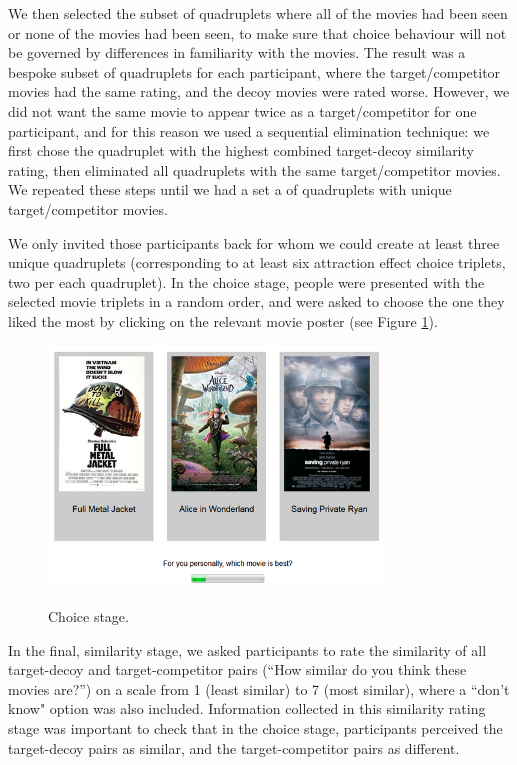 \documentclass[12pt, a4paper]{article}
\begin{document}
We then selected the subset of quadruplets where all of the movies had been seen or none of the movies had been seen, to make sure that choice behaviour will not be governed by differences in familiarity with the movies. The result was a bespoke subset of quadruplets for each participant, where the target/competitor movies had the same rating, and the decoy movies were rated worse. However, we did not want the same movie to appear twice as a target/competitor for one participant, and for this reason we used a sequential elimination technique: we first chose the quadruplet with the highest combined target-decoy similarity rating, then eliminated all quadruplets with the same target/competitor movies. We repeated these steps until we had a set a of quadruplets with unique target/competitor movies.

We only invited those participants back for whom we could create at least three unique quadruplets (corresponding to at least six attraction effect choice triplets, two per each quadruplet). In the choice stage, people were presented with the selected movie triplets in a random order, and were asked to choose the one they liked the most by clicking on the relevant movie poster (see Figure \ref{fig:exp1_screenshot}).

\begin{figure}[htb!]
\centering
\caption{Choice stage.}
\includegraphics[width=0.8\textwidth]{rsz_exp1_choicestage.png}
\label{fig:exp1_screenshot}
\end{figure}

In the final, similarity stage, we asked participants to rate the similarity of all target-decoy and target-competitor pairs (``How similar do you think these movies are?'') on a scale from 1 (least similar) to 7 (most similar), where a ``don't know" option was also included. Information collected in this similarity rating stage was important to check that in the choice stage, participants perceived the target-decoy pairs as similar, and the target-competitor pairs as different.
\end{document}
